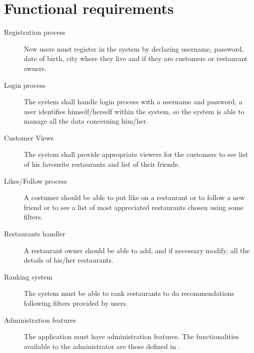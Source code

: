 \section{Functional requirements}\label{sec:functionalrequirements}

\begin{description}
	\item[Registration process] New users must register in the system by
		declaring username, password, date of birth, city where they
		live and if they are customers or restaurant owners.
	\item[Login process] The system shall handle login process with a
		username and password, a user identifies himself/herself within
		the system, so the system is able to manage all the data
		concerning him/her.
	\item[Customer Views] The system shall provide appropriate viewers for
		the customers to see list of his favourite restaurants and list
		of their friends.
	\item[Likes/Follow process] A costumer should be able to put like on a
		restaurant or to follow a new friend or to see a list of most
		appreciated restaurants chosen using some filters.
	\item[Restaurants handler] A restaurant owner should be able to add, and
		if necessary modify, all the details of his/her restaurants.
	\item[Ranking system] The system must be able to rank restaurants to do
		recommendations following filters provided by users.
	\item[Administration features] The application must have administration
		features. The functionalities available to the administrator are
		those defined in .
\end{description}